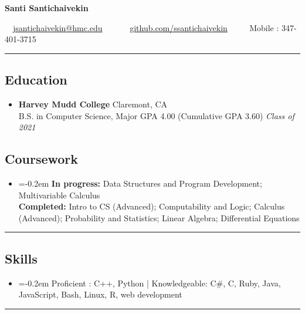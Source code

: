 \documentclass[10.5pt,letterpaper]{article}
\begin{document}
\begin{center}
{\Large \textbf{Santi Santichaivekin}}

\ \ \href{mailto:jsantichaivekin@hmc.edu}{jsantichaivekin@hmc.edu}\ \ 
\ \ \textbullet
\ \ \href{https://github.com/ssantichaivekin}{github.com/ssantichaivekin}
\ \ \textbullet
\ \ Mobile : 347-401-3715

\end{center}


\hrule
\vspace{-1.0em}
\subsection*{Education}
  \begin{itemize}
    \parskip=-0.5em

    \item[]
    \textbf{Harvey Mudd College} \hfill
      Claremont, CA\\
    {B.S. in Computer Science, Major GPA 4.00 (Cumulative GPA 3.60) \hfill \emph{Class of 2021}}
  \end{itemize}
  \vspace{-2.2em}
\subsection*{Coursework}
\begin{itemize}
\item[]
    \parskip=-0.2em
  \textbf{In progress:} Data Structures and Program Development; 
  Multivariable Calculus \\
  \textbf{Completed:} Intro to CS (Advanced); Computability and Logic; 
  Calculus (Advanced); 
  Probability and Statistics; Linear Algebra; 
  Differential Equations

\end{itemize}

\hrule
\vspace{-1.0em}
\subsection*{Skills}
\begin{itemize}
\item[]
    \parskip=-0.2em
  Proficient : C++, Python | Knowledgeable: C\#, C, Ruby, Java, JavaScript, Bash, Linux, R, web development
    
\end{itemize}

\hrule
\vspace{-1.0em}
\end{document}
